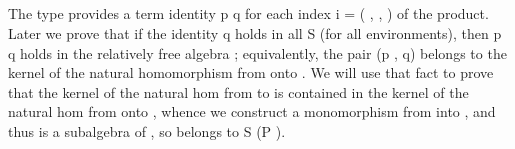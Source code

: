 \ifshort\else
\begin{code}%
\>[0]\<%
\\
%
\>[1]\AgdaSpace{}%
\AgdaSymbol{:}\AgdaSpace{}%
\AgdaSymbol{(}\AgdaSpace{}%
\AgdaSymbol{:}\AgdaSpace{}%
\AgdaSymbol{)}\AgdaSpace{}%
\AgdaSpace{}%
\AgdaSpace{}%
\AgdaSymbol{\}}\AgdaSpace{}%
\AgdaSpace{}%
\AgdaSpace{}%
\<%
\\
%
\>[1]\AgdaSpace{}%
\AgdaSpace{}%
\AgdaSymbol{\{}\AgdaSymbol{\}\{}\AgdaSymbol{\}}\AgdaSpace{}%
\AgdaSymbol{=}\AgdaSpace{}%
\AgdaSpace{}%
\AgdaSpace{}%
\AgdaSpace{}%
\AgdaSpace{}%
\AgdaSpace{}%
\AgdaSpace{}%
\AgdaSpace{}%
\AgdaSpace{}%
\AgdaSpace{}%
\AgdaSpace{}%
\AgdaSpace{}%
\AgdaSpace{}%
\AgdaSpace{}%
\AgdaSpace{}%
\AgdaSpace{}%
\AgdaSpace{}%
\<%
\\
\>[1][@{}l@{\AgdaIndent{0}}]%
\>[2]\AgdaSpace{}%
\AgdaSpace{}%
\AgdaSpace{}%
\AgdaOperator{\AgdaFunction{𝔻[}}\AgdaSpace{}%
\AgdaSpace{}%
\AgdaSpace{}%
\AgdaOperator{\AgdaFunction{]}}\AgdaSpace{}%
\AgdaSpace{}%
\AgdaSymbol{(}\AgdaSpace{}%
\AgdaSpace{}%
\AgdaSymbol{)}\AgdaSpace{}%
\AgdaSymbol{;}\AgdaSpace{}%
\AgdaSpace{}%
\AgdaSpace{}%
\AgdaSymbol{(}\AgdaSpace{}%
\AgdaSymbol{)}\AgdaSpace{}%
\AgdaSpace{}%
\AgdaSymbol{(}\AgdaSpace{}%
\AgdaSpace{}%
\AgdaSymbol{)}\<%
\\
\>[0]\<%
\end{code}
The type  provides a term identity \ab p  \ab q for each index \ab i = ( ,  , ) of the product.
Later we prove that if the identity   \ab q holds in all   \af S  (for all environments), then \ab p  \ab q
holds in the relatively free algebra ; equivalently, the pair (\ab p , \ab q) belongs to the
kernel of the natural homomorphism from  onto . We will use that fact to prove
that the kernel of the natural hom from  to  is contained in the kernel of the natural hom from  onto ,
whence we construct a monomorphism from  into , and thus  is a subalgebra of ,
so belongs to \af S (\af P ).
\fi


